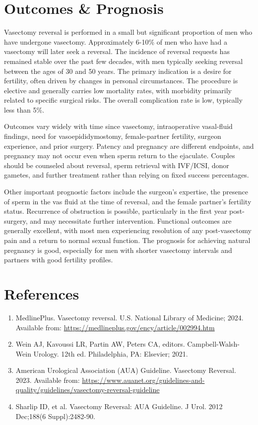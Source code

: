 \section*{Outcomes \& Prognosis}
Vasectomy reversal is performed in a small but significant proportion of men who have undergone vasectomy. Approximately 6-10\% of men who have had a vasectomy will later seek a reversal. The incidence of reversal requests has remained stable over the past few decades, with men typically seeking reversal between the ages of 30 and 50 years. The primary indication is a desire for fertility, often driven by changes in personal circumstances. The procedure is elective and generally carries low mortality rates, with morbidity primarily related to specific surgical risks. The overall complication rate is low, typically less than 5\%.

Outcomes vary widely with time since vasectomy, intraoperative vasal-fluid findings, need for vasoepididymostomy, female-partner fertility, surgeon experience, and prior surgery. Patency and pregnancy are different endpoints, and pregnancy may not occur even when sperm return to the ejaculate. Couples should be counseled about reversal, sperm retrieval with IVF/ICSI, donor gametes, and further treatment rather than relying on fixed success percentages.

Other important prognostic factors include the surgeon's expertise, the presence of sperm in the vas fluid at the time of reversal, and the female partner's fertility status. Recurrence of obstruction is possible, particularly in the first year post-surgery, and may necessitate further intervention. Functional outcomes are generally excellent, with most men experiencing resolution of any post-vasectomy pain and a return to normal sexual function. The prognosis for achieving natural pregnancy is good, especially for men with shorter vasectomy intervals and partners with good fertility profiles.

\section*{References}
\begin{enumerate}
  \item MedlinePlus. Vasectomy reversal. U.S. National Library of Medicine; 2024. Available from: \url{https://medlineplus.gov/ency/article/002994.htm}
  
  \item Wein AJ, Kavoussi LR, Partin AW, Peters CA, editors. Campbell-Walsh-Wein Urology. 12th ed. Philadelphia, PA: Elsevier; 2021.
  
  \item American Urological Association (AUA) Guideline. Vasectomy Reversal. 2023. Available from: \url{https://www.auanet.org/guidelines-and-quality/guidelines/vasectomy-reversal-guideline}
  
  \item Sharlip ID, et al. Vasectomy Reversal: AUA Guideline. J Urol. 2012 Dec;188(6 Suppl):2482-90.
\end{enumerate}

\clearpage
